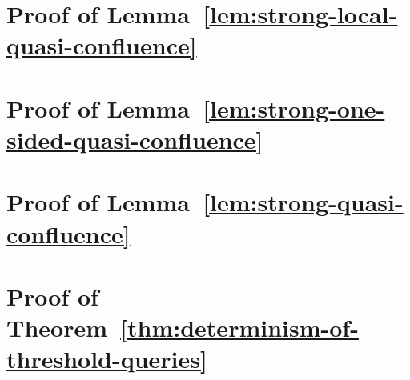 \section{Proof of Lemma~\ref{lem:strong-local-quasi-confluence}}\label{section:strong-local-quasi-confluence-proof}


\section{Proof of Lemma~\ref{lem:strong-one-sided-quasi-confluence}}\label{section:strong-one-sided-quasi-confluence-proof}


\section{Proof of Lemma~\ref{lem:strong-quasi-confluence}}\label{section:strong-quasi-confluence-proof}


\section{Proof of Theorem~\ref{thm:determinism-of-threshold-queries}}\label{section:determinism-of-threshold-queries-proof}


